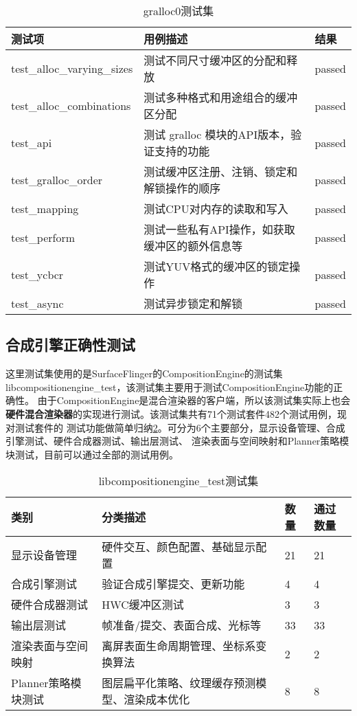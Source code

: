 \begin{table}[H]
    \centering
    \caption{gralloc0测试集}
    \label{tab:gralloc0测试集}
    \begin{tabular}{lll}
      \toprule
      测试项 & 用例描述 & 结果 \\
      \midrule
      test\_alloc\_varying\_sizes & 测试不同尺寸缓冲区的分配和释放 & passed\\
      test\_alloc\_combinations & 测试多种格式和用途组合的缓冲区分配 & passed\\
      test\_api & 测试 gralloc 模块的API版本，验证支持的功能 & passed\\
      test\_gralloc\_order & 测试缓冲区注册、注销、锁定和解锁操作的顺序 & passed\\
      test\_mapping & 测试CPU对内存的读取和写入 & passed\\
      test\_perform & 测试一些私有API操作，如获取缓冲区的额外信息等 & passed\\
      test\_ycbcr & 测试YUV格式的缓冲区的锁定操作 & passed\\
      test\_async & 测试异步锁定和解锁 & passed\\
      \bottomrule
    \end{tabular}
    \note{}
\end{table}

\subsection{合成引擎正确性测试}
\label{sec:合成引擎正确性测试}

这里测试集使用的是SurfaceFlinger的CompositionEngine的测试集libcompositionengine\_test，该测试集主要用于测试CompositionEngine功能的正确性。
由于CompositionEngine是混合渲染器的客户端，所以该测试集实际上也会\textbf{硬件混合渲染器}的实现进行测试。该测试集共有71个测试套件482个测试用例，现对测试套件的
测试功能做简单归纳\ref{tab:libcompositionengine_test测试集}。可分为6个主要部分，显示设备管理、合成引擎测试、硬件合成器测试、输出层测试、
渲染表面与空间映射和Planner策略模块测试，目前可以通过全部的测试用例。

\begin{table}[H]
    \centering
    \caption{libcompositionengine\_test测试集}
    \label{tab:libcompositionengine_test测试集}
    \begin{tabular}{llll}
      \toprule
      类别 &  分类描述 & 数量 & 通过数量\\
      \midrule
      显示设备管理 & 硬件交互、颜色配置、基础显示配置 & 21 & 21\\
      合成引擎测试 & 验证合成引擎提交、更新功能 & 4 & 4\\
      硬件合成器测试 & HWC缓冲区测试 & 3 & 3\\
      输出层测试 & 帧准备/提交、表面合成、光标等  & 33 & 33\\
      渲染表面与空间映射 & 	离屏表面生命周期管理、坐标系变换算法 & 2 & 2\\
      Planner策略模块测试 & 图层扁平化策略、纹理缓存预测模型、渲染成本优化 & 8 & 8\\
      \bottomrule
    \end{tabular}
    \note{}
\end{table}

